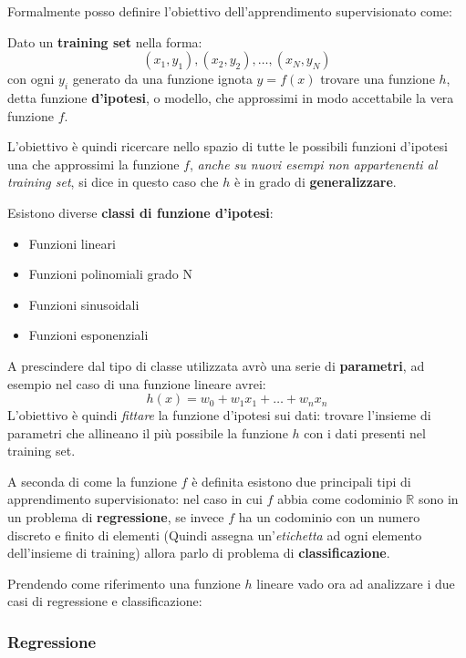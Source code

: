 \documentclass[../../main.tex]{subfiles}
\begin{document}
    Formalmente posso definire l'obiettivo dell'apprendimento supervisionato come:
    
    \begin{dfn}
        Dato un \textbf{training set} nella forma:
        \[(x_1, y_1), (x_2, y_2), \dots, (x_N, y_N)\]
        con ogni $y_i$ generato da una funzione ignota $y = f(x)$ trovare una funzione $h$, detta funzione \textbf{d'ipotesi}, o modello, che approssimi in modo accettabile la vera funzione $f$.
    \end{dfn}

    L'obiettivo è quindi ricercare nello spazio di tutte le possibili funzioni d'ipotesi una che approssimi la funzione $f$, \textit{anche su nuovi esempi non appartenenti al training set}, si dice in questo caso che $h$ è in grado di \textbf{generalizzare}.

    Esistono diverse \textbf{classi di funzione d'ipotesi}:
    \begin{itemize}
        \item Funzioni lineari
        \item Funzioni polinomiali grado N
        \item Funzioni sinusoidali
        \item Funzioni esponenziali
    \end{itemize}

    A prescindere dal tipo di classe utilizzata avrò una serie di \textbf{parametri}, ad esempio nel caso di una funzione lineare avrei:
    \[h(x) = w_0 + w_1x_1 + \dots + w_nx_n\]
    L'obiettivo è quindi \textit{fittare} la funzione d'ipotesi sui dati: trovare l'insieme di parametri che allineano il più possibile la funzione $h$ con i dati presenti nel training set. 

    A seconda di come la funzione $f$ è definita esistono due principali tipi di apprendimento supervisionato: nel caso in cui $f$ abbia come codominio $\mathbb{R}$ sono in un problema di \textbf{regressione}, se invece $f$ ha un codominio con un numero discreto e finito di elementi (Quindi assegna un'\textit{etichetta} ad ogni elemento dell'insieme di training) allora parlo di problema di \textbf{classificazione}.

    Prendendo come riferimento una funzione $h$ lineare vado ora ad analizzare i due casi di regressione e classificazione:

    \subsubsection{Regressione}{}
    
\end{document}
